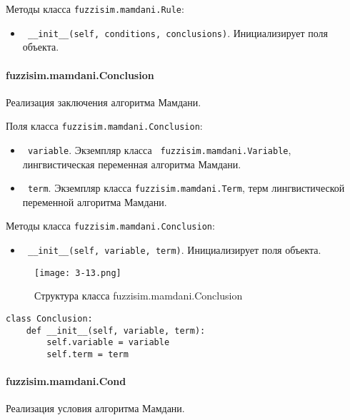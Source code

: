 Методы класса \lstinline!fuzzisim.mamdani.Rule!:
\begin{itemize}
	\item \lstinline! __init__(self, conditions, conclusions)!. Инициализирует поля объекта.
\end{itemize}



\paragraph{fuzzisim.mamdani.Conclusion}

Реализация заключения алгоритма Мамдани.

Поля класса \lstinline!fuzzisim.mamdani.Conclusion!:
\begin{itemize}
	\item \lstinline! variable!. Экземпляр класса \lstinline! fuzzisim.mamdani.Variable!, лингвистическая переменная алгоритма Мамдани.
	\item \lstinline! term!.   Экземпляр класса  \lstinline!fuzzisim.mamdani.Term!, терм лингвистической переменной алгоритма Мамдани.
\end{itemize}


Методы класса \lstinline!fuzzisim.mamdani.Conclusion!:
\begin{itemize}
	\item \lstinline! __init__(self, variable, term)!. Инициализирует поля объекта.
\end{itemize}


\begin{figure}[ht]
	\centering
	\texttt{[image: 3-13.png]}
	\caption{ Структура класса fuzzisim.mamdani.Conclusion}
\end{figure}

\begin{lstlisting}[style=pythonstyle,caption={  }, label=lst:func:1]
class Conclusion:
	def __init__(self, variable, term):
		self.variable = variable
		self.term = term
\end{lstlisting}


\paragraph{fuzzisim.mamdani.Cond}

Реализация условия алгоритма Мамдани.

